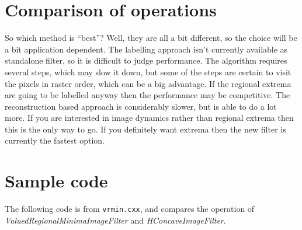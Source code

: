\documentclass{InsightArticle}
\begin{document}
\section{Comparison of operations}
So which method is ``best''? Well, they are all a bit different, so
the choice will be a bit application dependent. The labelling approach
isn't currently available as standalone filter, so it is difficult to
judge performance. The algorithm requires several steps, which may
slow it down, but some of the steps are certain to visit the pixels in
raster order, which can be a big advantage. If the regional extrema
are going to be labelled anyway then the performance may be
competitive. The reconstruction based approach is considerably slower,
but is able to do a lot more. If you are interested in image dynamics
rather than regional extrema then this is the only way to go. If you
definitely want extrema then the new filter is currently the fastest
option.

\section{Sample code}
The following code is from {\tt vrmin.cxx}, and compares the operation
of {\em ValuedRegionalMinimaImageFilter} and {\em HConcaveImageFilter}.
\end{document}
